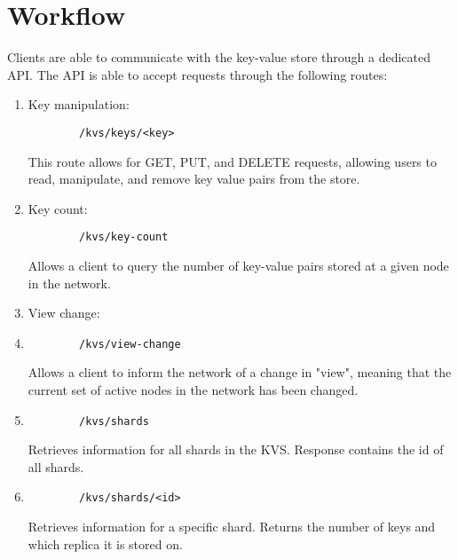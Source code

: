 \documentclass[12pt]{article}
\begin{document}
\section{Workflow}
Clients are able to communicate with the key-value store through a dedicated API. The API is able to accept requests through the following routes:
\begin{enumerate}
	\item Key manipulation:
	\begin{verbatim}
		/kvs/keys/<key>
	\end{verbatim}
	This route allows for GET, PUT, and DELETE requests, allowing users to read, manipulate, and remove key value pairs from the store.
	\item Key count:
	\begin{verbatim}
		/kvs/key-count
	\end{verbatim}
	Allows a client to query the number of key-value pairs stored at a given node in the network.
	\item View change:
	\item \begin{verbatim}
		/kvs/view-change
	\end{verbatim}
	Allows a client to inform the network of a change in "view", meaning that the current set of active nodes in the network has been changed.
	\item \begin{verbatim}
		/kvs/shards
	\end{verbatim}
	Retrieves information for all shards in the KVS. Response contains the id of all shards.
	\item \begin{verbatim}
		/kvs/shards/<id>
	\end{verbatim}
	Retrieves information for a specific shard. Returns the number of keys and which replica it is stored on.
\end{enumerate}
\end{document}
